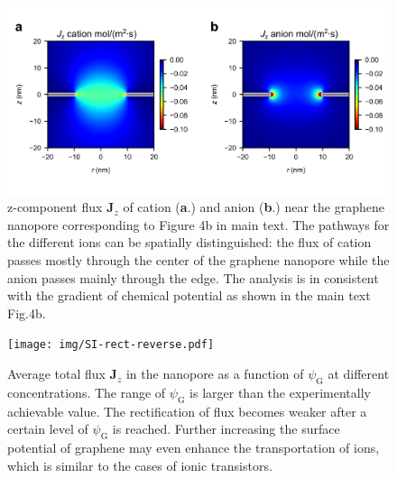 \documentclass[manuscript=suppinfo,email=true, hyperref=true, keywords=false]{achemso}
\newcommand{\Fig}{Fig.}
\begin{document}
\begin{figure}[htbp]
  \centering
  \includegraphics[width=0.8\linewidth]{img/SI-flux.png}
  \caption{z-component flux $\boldsymbol{J}_{z}$ of cation
    (\textbf{a}.)  and anion (\textbf{b}.) near the graphene nanopore
    corresponding to Figure 4b in main text. The pathways for the
    different ions can be spatially distinguished: the flux of cation
    passes mostly through the center of the graphene nanopore while
    the anion passes mainly through the edge. The analysis is in
    consistent with the gradient of chemical potential as shown in the
    main text \Fig 4b.}
  \label{fig:flux}
\end{figure}

\begin{figure}[htbp]
  \centering
  \texttt{[image: img/SI-rect-reverse.pdf]}
  \caption{Average total flux $\boldsymbol{J}_{z}$ in the nanopore as
    a function of $\psi_{\mathrm{G}}$ at different concentrations. The
    range of $\psi_{\mathrm{G}}$ is larger than the experimentally
    achievable value. The rectification of flux becomes weaker after a
    certain level of $\psi_{\mathrm{G}}$ is reached. Further
    increasing the surface potential of graphene may even enhance the
    transportation of ions, which is similar to the cases of ionic
    transistors.}
  \label{fig:reverse}
\end{figure}
\end{document}
